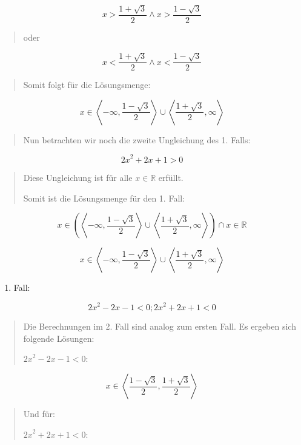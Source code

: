\documentclass[a4paper, 12pt]{book}
\begin{document}
\begin{longtable}[]
\begin{minipage}[b]{\linewidth}
\[x > \frac{1 + \sqrt{3}}{2} \land x > \frac{1 - \sqrt{3}}{2}\]

\begin{quote}
oder
\end{quote}

\[x < \frac{1 + \sqrt{3}}{2} \land x < \frac{1 - \sqrt{3}}{2}\]

\begin{quote}
Somit folgt für die Lösungsmenge:
\end{quote}

\[x \in \left\langle  - \infty,\frac{1 - \sqrt{3}}{2} \right\rangle \cup \left\langle \frac{1 + \sqrt{3}}{2},\infty \right\rangle\]

\begin{quote}
Nun betrachten wir noch die zweite Ungleichung des 1. Falls:
\end{quote}

\[{2x}^{2} + 2x + 1 > 0\]

\begin{quote}
Diese Ungleichung ist für alle \(x\mathbb{ \in R}\) erfüllt.

Somit ist die Lösungsmenge für den 1. Fall:
\end{quote}

\[x \in (\left\langle  - \infty,\frac{1 - \sqrt{3}}{2} \right\rangle \cup \left\langle \frac{1 + \sqrt{3}}{2},\infty \right\rangle) \cap x\mathbb{ \in R}\]

\[x \in \left\langle  - \infty,\frac{1 - \sqrt{3}}{2} \right\rangle \cup \left\langle \frac{1 + \sqrt{3}}{2},\infty \right\rangle\]

\begin{enumerate}
\def\labelenumi{\arabic{enumi}.}
\setcounter{enumi}{1}
\item
  Fall:
\end{enumerate}

\[{2x}^{2} - 2x - 1 < 0;{2x}^{2} + 2x + 1 < 0\]

\begin{quote}
Die Berechnungen im 2. Fall sind analog zum ersten Fall. Es ergeben sich
folgende Lösungen:

\({2x}^{2} - 2x - 1 < 0\):
\end{quote}

\[x \in \left\langle \frac{1 - \sqrt{3}}{2},\frac{1 + \sqrt{3}}{2} \right\rangle\]

\begin{quote}
Und für:

\({2x}^{2} + 2x + 1 < 0\):
\end{quote}


\end{minipage}
\end{longtable}
\end{document}

